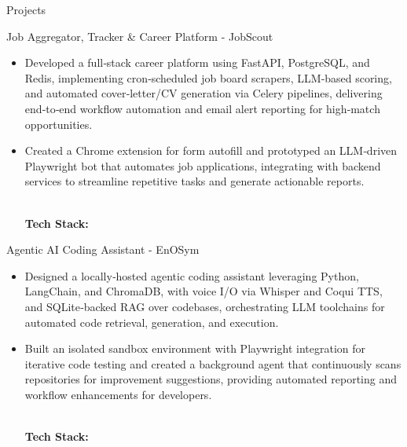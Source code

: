 \documentclass{resume}
\newcommand{\tagged}[2]{\hypertarget{#1}{#2}}
\begin{document}
\vspace{-2mm}
\begin{rSection}{Projects}
\vspace{-1mm}

\fontsize{10}{12}\begin{rSubsection}
  {\tagged{21bab9b8_name}{Job Aggregator, Tracker & Career Platform - JobScout}}{}{}{}
{\fontsize{9}{12}\selectfont
\begin{itemize}
  \renewcommand{\labelitemi}{\scriptsize\textbullet}
  \setlength{\itemsep}{-0.3em}

  \item \tagged{proj_21bab9b8_b1}{Developed a full‑stack career platform using FastAPI, PostgreSQL, and Redis, implementing cron‑scheduled job board scrapers, LLM‑based scoring, and automated cover‑letter/CV generation via Celery pipelines, delivering end‑to‑end workflow automation and email alert reporting for high‑match opportunities.}

  \item \tagged{proj_21bab9b8_b2}{Created a Chrome extension for form autofill and prototyped an LLM‑driven Playwright bot that automates job applications, integrating with backend services to streamline repetitive tasks and generate actionable reports.}

  \\ \textbf{Tech Stack:} \textit{\tagged{21bab9b8_stack}{}}
\end{itemize}}
\end{rSubsection}
\vspace{-2mm}

\fontsize{10}{12}\begin{rSubsection}
  {\tagged{5c7fc21f_name}{Agentic AI Coding Assistant - EnOSym}}{}{}{}
{\fontsize{9}{12}\selectfont
\begin{itemize}
  \renewcommand{\labelitemi}{\scriptsize\textbullet}
  \setlength{\itemsep}{-0.3em}

  \item \tagged{proj_5c7fc21f_b1}{Designed a locally‑hosted agentic coding assistant leveraging Python, LangChain, and ChromaDB, with voice I/O via Whisper and Coqui TTS, and SQLite‑backed RAG over codebases, orchestrating LLM toolchains for automated code retrieval, generation, and execution.}

  \item \tagged{proj_5c7fc21f_b2}{Built an isolated sandbox environment with Playwright integration for iterative code testing and created a background agent that continuously scans repositories for improvement suggestions, providing automated reporting and workflow enhancements for developers.}

  \\ \textbf{Tech Stack:} \textit{\tagged{5c7fc21f_stack}{}}
\end{itemize}}
\end{rSubsection}
\vspace{-2mm}

\end{rSection}
\end{document}
